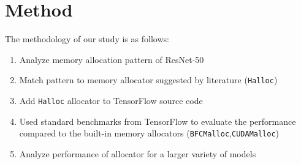 \documentclass[12pt,twoside]{article}
\begin{document}






\section{Method}
\label{sec:methods}


The methodology of our study is as follows:
\begin{enumerate}
\vspace{-5px}
\itemsep-0.25em
    \item Analyze memory allocation pattern of ResNet-50
    \item Match pattern to memory allocator suggested by literature (\texttt{Halloc})
    \item Add \texttt{Halloc} allocator to TensorFlow source code
    \item Used standard benchmarks from TensorFlow to evaluate the performance compared to the built-in memory allocators (\texttt{BFCMalloc},\texttt{CUDAMalloc})
    \item Analyze performance of allocator for a larger variety of models
\vspace{-5px}
\end{enumerate}
\end{document}
